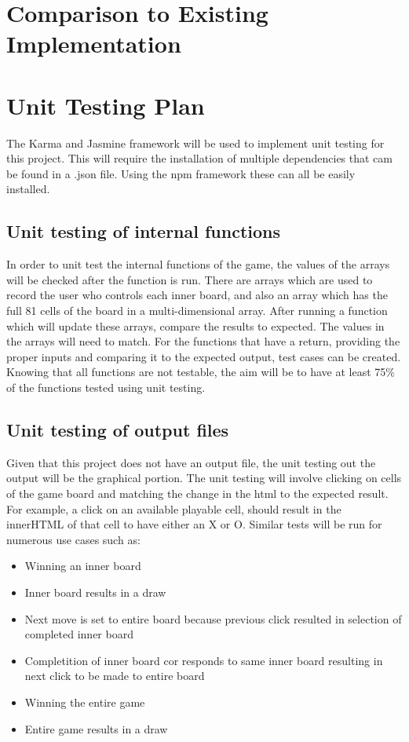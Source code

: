 \documentclass[12pt, titlepage]{article}
\begin{document}
\section{Comparison to Existing Implementation}
	
				
\section{Unit Testing Plan}
The Karma and Jasmine framework will be used to implement unit testing for this project. This will require the installation of multiple dependencies that cam be found in a .json file. Using the npm framework these can all be easily installed. 
\subsection{Unit testing of internal functions}
In order to unit test the internal functions of the game, the values of the arrays will be checked after the function is run. There are arrays which are used to record the user who controls each inner board, and also an array which has the full 81 cells of the board in a multi-dimensional array. After running a function which will update these arrays, compare the results to expected. The values in the arrays will need to match. For the functions that have a return, providing the proper inputs and comparing it to the expected output, test cases can be created. Knowing that all functions are not testable, the aim will be to have at least 75\% of the functions tested using unit testing.
\subsection{Unit testing of output files}		
Given that this project does not have an output file, the unit testing out the output will be the graphical portion. The unit testing will involve clicking on cells of the game board and matching the change in the html to the expected result. For example, a click on an available playable cell, should result in the innerHTML of that cell to have either an X or O. Similar tests will be run for numerous use cases such as:
\begin{itemize}
\item
Winning an inner board
\item
Inner board results in a draw
\item
Next move is set to entire board because previous click resulted in selection of completed inner board
\item
Completition of inner board cor	responds to same inner board resulting in next click to be made to entire board
\item
Winning the entire game
\item
Entire game results in a draw
\end{itemize}

\end{document}
